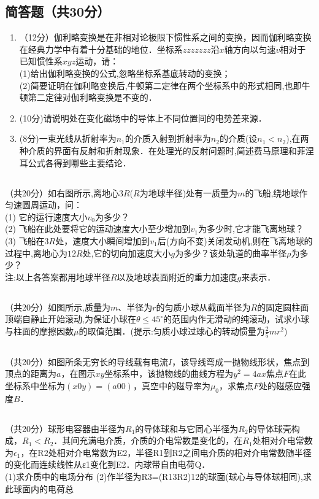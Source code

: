 \subsection{简答题（共30分）}
\begin{enumerate}
\item （12分）伽利略变换是在非相对论极限下惯性系之间的变换，因而伽利略变换在经典力学中有着十分基础的地位．坐标系$zzzzzzz$沿$x$轴方向以匀速$v$相对于已知惯性系$xyz$运动，请：\\
(1)给出伽利略变换的公式,忽略坐标系基底转动的变换；\\
(2)简要证明在伽利略变换后,牛顿第二定律在两个坐标系中的形式相同,也即牛顿第二定律对伽利略变换是不变的．\\

\item (10分)请说明处在变化磁场中的导体上不同位置间的电势差来源．

\item (8分)一束光线从折射率为$n_{1}$的介质入射到折射率为$n_{2}$的介质(设$n_{1}<n_{2}$),在两种介质的界面有反射和折射现象．在处理光的反射问题时,简述费马原理和菲涅耳公式各得到哪些主要结论．
\end{enumerate}
\subsection{ }
（共20分）如右图所示,离地心$3R$($R$为地球半径)处有一质量为$m$的飞船,绕地球作匀速圆周运动，问：\\
(1) 它的运行速度大小$v_{0}$为多少？\\
(2) 飞船在此处要将它的运动速度大小至少增加到$v_{1}$为多少时,它才能飞离地球？\\
(3) 飞船在$3R$处，速度大小瞬间增加到$v_{1}$后(方向不变)关闭发动机,则在飞离地球的过程中,离地心为$12R$处,它的切向加速度大小$g$为多少？该处轨道的曲率半径$\rho$为多少？\\
注:以上各答案都用地球半径$R$以及地球表面附近的重力加速度$g$来表示．

\subsection{ }
（共20分）如图所示,质量为$m$、半径为$r$的匀质小球从截面半径为$R$的固定圆柱面顶端自静止开始滚动,为保证小球在$\theta \le 45^{\circ}$的范围内作无滑动的纯滚动，试求小球与柱面的摩擦因数$\mu$的取值范围．(提示:匀质小球过球心的转动惯量为$\frac{2}{5} mr^{2}$)

\subsection{ }
（共20分）如图所条无穷长的导线载有电流$I$，该导线弯成一抛物线形状，焦点到顶点的距离为$a$，在图示$xy$坐标系中，该抛物线的曲线方程为$y^{2}=4ax$焦点$F$在此坐标系中坐标为$(x0y)=(a00)$，真空中的磁导率为$\mu_{0}$，求焦点$F$处的磁感应强度$B$．

\subsection{ }
（共20分）球形电容器由半径为$R_1$的导体球和与它同心半径为$R_2$的导体球壳构成，$R_1<R_2$．其间充满电介质，介质的介电常数是变化的，在$R_1$处相对介电常数为$\epsilon_1$，在R2处相对介电常数为E2，半径R1到R2之间电介质的相对介电常数随半径的变化而连续线性从ε1变化到E2．内球带自由电荷Q．\\
(1)求介质中的电场分布
(2)作半径为R3=(R13R2)12的球面(球心与导体球相同),求此球面内的电荷总